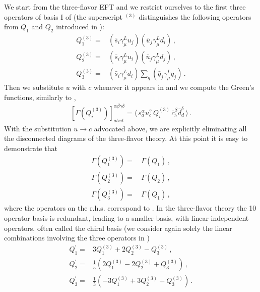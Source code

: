 \documentclass[aps,prd,twocolumn,nofootinbib,showpacs,superscriptaddress]{revtex4-1}
\begin{document}
We start from the three-flavor EFT and we restrict ourselves to the first three
operators of basis I of  (the superscript $^{(3)}$ 
distinguishes the following operators from $Q_1$ and $Q_2$ introduced in 
):
\begin{equation}
\begin{split}
Q_1^{(3)} = & (\bar s_i \gamma_\mu^L u_j) (\bar u_j \gamma_\mu^L d_i) \,, \\
Q_2^{(3)} = & (\bar s_i \gamma_\mu^L u_i) (\bar u_j \gamma_\mu^L d_j) \,, \\
Q_3^{(3)} = & (\bar s_i \gamma_\mu^L d_i) \sum_q (\bar q_j \gamma_\mu^L q_j) \,. 
\end{split} 
\label{eq:Q123}
\end{equation}
Then we substitute $u$ with $c$ whenever it appears in 
and we compute the Green's functions, similarly to ,
\begin{equation}
\begin{split}
[\Gamma(Q_i^{(3)})]^{\alpha \beta \gamma \delta}_{a b c d}   = 
\langle \, s^\alpha_a u^\gamma_c \, Q_i^{(3)} \, \bar c^\beta_b \bar d^\delta_d \, \rangle \,.
\end{split}
\end{equation}
With the substitution $u \to c$ advocated above, 
we are explicitly eliminating all the disconnected diagrams 
of the three-flavor theory. At this point
it is easy to demonstrate that
\begin{equation}
\begin{split}
\Gamma(Q_1^{(3)}) = \, & \Gamma(Q_1) \,, \\ 
\Gamma(Q_2^{(3)}) = \, & \Gamma(Q_2) \,, \\ 
\Gamma(Q_3^{(3)}) = \, & \Gamma(Q_1) \,,
\end{split}
\label{eq:Q123_Q12}
\end{equation}
where the operators on the r.h.s. correspond to .
In the three-flavor theory the 10 operator basis is redundant, 
leading to a smaller basis, with linear independent operators,
often called the chiral basis (we consider again solely the linear
combinations involving the three operators in )
\begin{equation}
\begin{split}
Q_1^\prime = & 3 Q_1^{(3)} + 2 Q_2^{(3)} - Q_3^{(3)} \,, \\
Q_2^\prime = & \tfrac{1}{5} (2 Q_1^{(3)} - 2Q_2^{(3)} + Q_3^{(3)}) \,, \\
Q_3^\prime = & \tfrac{1}{5} (-3 Q_1^{(3)} +3 Q_2^{(3)} + Q_3^{(3)}) \,.
\end{split}
\label{eq:chiral_basis}
\end{equation}
\end{document}
